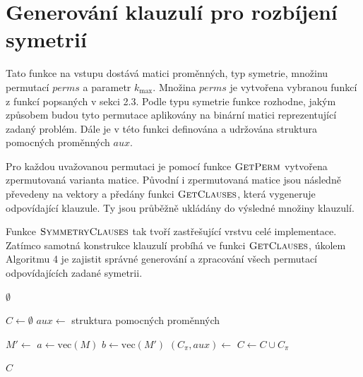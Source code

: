 \section{Generování klauzulí pro rozbíjení symetrií}
Tato funkce na vstupu dostává matici proměnných, typ symetrie, množinu permutací $perms$ a parametr $k_{\max}$. Množina $perms$ je vytvořena vybranou funkcí z funkcí popsaných v sekci 2.3. Podle typu symetrie funkce rozhodne, jakým způsobem budou tyto permutace aplikovány na binární matici reprezentující zadaný problém. Dále je v této funkci definována a udržována struktura pomocných proměnných $aux$.

Pro každou uvažovanou permutaci je pomocí funkce $\textproc{GetPerm}$ vytvořena zpermutovaná varianta matice. Původní i zpermutovaná matice jsou následně převedeny na vektory a předány funkci $\textproc{GetClauses}$, která vygeneruje odpovídající klauzule. Ty jsou průběžně ukládány do výsledné množiny klauzulí.

Funkce $\textproc{SymmetryClauses}$ tak tvoří zastřešující vrstvu celé implementace. Zatímco samotná konstrukce klauzulí probíhá ve funkci $\textproc{GetClauses}$, úkolem Algoritmu 4 je zajistit správné generování a zpracování všech permutací odpovídajících zadané symetrii.

\begin{algorithm}[H]
\caption{Generování klauzulí pro rozbíjení symetrií}
\begin{algorithmic}[1]
\State \Return $\emptyset$
\EndIf

\State $C\gets\emptyset$
\State $aux\gets$ struktura pomocných proměnných

    	\State $M' \gets $
    	\State $a\gets \text{vec}(M)$
    	\State $b\gets \text{vec}(M')$
    	\State $(C_\pi,aux)\gets$
    	\State $C\gets C\cup C_\pi$
\EndFor

\State \Return $C$

\EndFunction
\end{algorithmic}
\end{algorithm}
